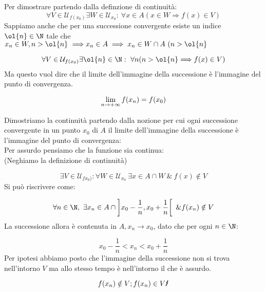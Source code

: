 \documentclass[../analisi.tex]{subfiles}
\begin{document}
\begin{dimo}
Per dimostrare partendo dalla definzione di continuità:
\begin{equation}
	\forall V \in \mathcal{U}_{f(x_0)} \exists W \in \mathcal{U}_{x_0}:\
	\forall x \in A ( x \in W \Longrightarrow f(x) \in V)
\end{equation}
Sappiamo anche che per una successione convergente esiste un indice $\ol{n} \in \N$
tale che $x_n \in W, n > \ol{n}\ \Longrightarrow x_n \in A \implies x_n \in W 
\cap A\ (n > \ol{n}$


\begin{equation}
	\forall V \in \mathcal{U}_{f(x_0)} \exists \ol{n} \in \N:\
	\forall n( n > \ol{n} \Longrightarrow f(x) \in V)
\end{equation}
Ma questo vuol dire che il limite dell'immagine della successione è l'immagine del
punto di convergenza.

\begin{equation}
	\lim \limits_{n \to + \infty} f(x_n) = f(x_0)
\end{equation}
\end{dimo}


\begin{dimo}
Dimostriamo la continuità partendo dalla nozione per cui ogni successione
convergente in un punto $x_0$ di $A$ il limite dell'immagine della successione
è l'immagine del punto di convergenza:\\
Per assurdo \Lightning pensiamo che la funzione sia \bt{non} continua:\\
(Neghiamo la definizione di continuità)

\begin{equation}
	\exists V \in \mathcal{U}_{fx_0)}: \forall W \in \mathcal{U}_{x_0}
	\ \exists x \in A \cap W\ \&\ f(x) \notin V
\end{equation}
Si può riscrivere come:

\begin{equation}
	\forall n \in \N,\ \exists x_n \in A \cap \left] x_0 - \frac{1}{n},
	x_0 + \frac{1}{n} \right[\ \& f(x_n) \notin V
\end{equation}
La successione allora è contenuta in $A, x_n \to x_0$, dato che per ogni 
$n \in \N$:

\begin{equation}
	x_0 - \frac{1}{n} < x_n < x_0 + \frac{1}{n}  
\end{equation}
Per ipotesi abbiamo posto che l'immagine della successione non si trova nell'intorno
$V$ ma allo stesso tempo è nell'intorno il che è assurdo.

\begin{equation}
	f(x_n) \notin V ; f(x_n) \in V \text{\Lightning}
\end{equation}
\end{dimo}
\end{document}
